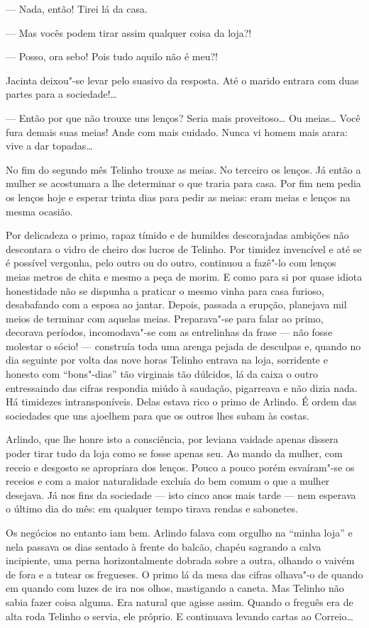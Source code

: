 --- Nada, então! Tirei lá da casa.

--- Mas vocês podem tirar assim qualquer coisa da loja?!

--- Posso, ora sebo! Pois tudo aquilo não é meu?!

Jacinta deixou"-se levar pelo suasivo da resposta. Até o marido entrara
com duas partes para a sociedade!\ldots{}

--- Então por que não trouxe uns lenços? Seria mais proveitoso\ldots{} Ou
meias\ldots{} Você fura demais suas meias! Ande com mais cuidado. Nunca vi
homem mais arara: vive a dar topadas\ldots{}

No fim do segundo mês Telinho trouxe as meias. No terceiro os lenços. Já
então a mulher se acostumara a lhe determinar o que traria para casa.
Por fim nem pedia os lenços hoje e esperar trinta dias para pedir as
meias: eram meias e lenços na mesma ocasião.

Por delicadeza o primo, rapaz tímido e de humildes descorajadas ambições
não descontara o vidro de cheiro dos lucros de Telinho. Por timidez
invencível e até se é possível vergonha, pelo outro ou do outro,
continuou a fazê"-lo com lenços meias metros de chita e mesmo a peça de
morim. E como para si por quase idiota honestidade não se dispunha a
praticar o mesmo vinha para casa furioso, desabafando com a esposa ao
jantar. Depois, passada a erupção, planejava mil meios de terminar com
aquelas meias. Preparava"-se para falar ao primo, decorava períodos,
incomodava"-se com as entrelinhas da frase --- não fosse molestar o sócio!
--- construía toda uma arenga pejada de desculpas e, quando no dia
seguinte por volta das nove horas Telinho entrava na loja, sorridente e
honesto com ``bons"-dias'' tão virginais tão dúlcidos, lá da caixa o
outro entressaindo das cifras respondia miúdo à saudação, pigarreava e
não dizia nada. Há timidezes intransponíveis. Delas estava rico o primo
de Arlindo.
É ordem das sociedades que uns ajoelhem para que os outros lhes subam às
costas.

Arlindo, que lhe honre isto a consciência, por leviana vaidade apenas
dissera poder tirar tudo da loja como se fosse apenas seu. Ao mando da
mulher, com receio e desgosto se apropriara dos lenços. Pouco a pouco
porém esvaíram"-se os receios e com a maior naturalidade excluía do bem
comum o que a mulher desejava. Já nos fins da sociedade --- isto cinco
anos mais tarde --- nem esperava o último dia do mês: em qualquer tempo
tirava rendas e sabonetes.

Os negócios no entanto iam bem. Arlindo falava com orgulho na ``minha
loja'' e nela passava os dias sentado à frente do balcão, chapéu
sagrando a calva incipiente, uma perna horizontalmente dobrada sobre a
outra, olhando o vaivém de fora e a tutear os fregueses. O primo lá da
mesa das cifras olhava"-o de quando em quando com luzes de ira nos olhos,
mastigando a caneta. Mas Telinho não sabia fazer coisa alguma. Era
natural que agisse assim. Quando o freguês era de alta roda Telinho o
servia, ele próprio. E continuava levando cartas ao Correio\ldots{}

